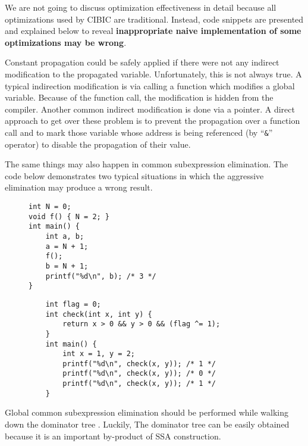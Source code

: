 \documentclass[10pt, a4paper]{article}
\begin{document}
We are not going to discuss optimization effectiveness in detail because all
optimizations used by CIBIC are traditional. Instead, code snippets are
presented and explained below to reveal \textbf{inappropriate naive
implementation of some optimizations may be wrong}.

Constant propagation could be safely applied if there were not any indirect
modification to the propagated variable. Unfortunately, this is not always true.
A typical indirection modification is via calling a function which modifies a
global variable. Because of the function call, the modification is hidden from
the compiler. Another common indirect modification is done via a pointer. A
direct approach to get over these problem is to prevent the propagation over a
function call and to mark those variable whose address is being referenced (by
``\texttt{\&}'' operator) to disable the propagation of their value.

The same things may also happen in common subexpression elimination. The code
below demonstrates two typical situations in which the aggressive elimination
may produce a wrong result.
\begin{figure}[H]
    \begin{minipage}{0.4\textwidth}
    \centering
        \begin{verbatim}
int N = 0;
void f() { N = 2; }
int main() {
    int a, b;
    a = N + 1;
    f();
    b = N + 1;
    printf("%d\n", b); /* 3 */
}
        \end{verbatim}
    \end{minipage}
    \begin{minipage}{0.5\textwidth}
        \centering
\begin{verbatim}
    int flag = 0;
    int check(int x, int y) {
        return x > 0 && y > 0 && (flag ^= 1);
    }
    int main() {
        int x = 1, y = 2;
        printf("%d\n", check(x, y)); /* 1 */
        printf("%d\n", check(x, y)); /* 0 */
        printf("%d\n", check(x, y)); /* 1 */
    }
\end{verbatim}
    \end{minipage}
    \label{fig:cse}
\end{figure}
Global common subexpression elimination should be performed while walking down
the dominator tree \cite{sassa07}. Luckily, The dominator tree can be easily
obtained because it is an important by-product of SSA construction. 
\end{document}
